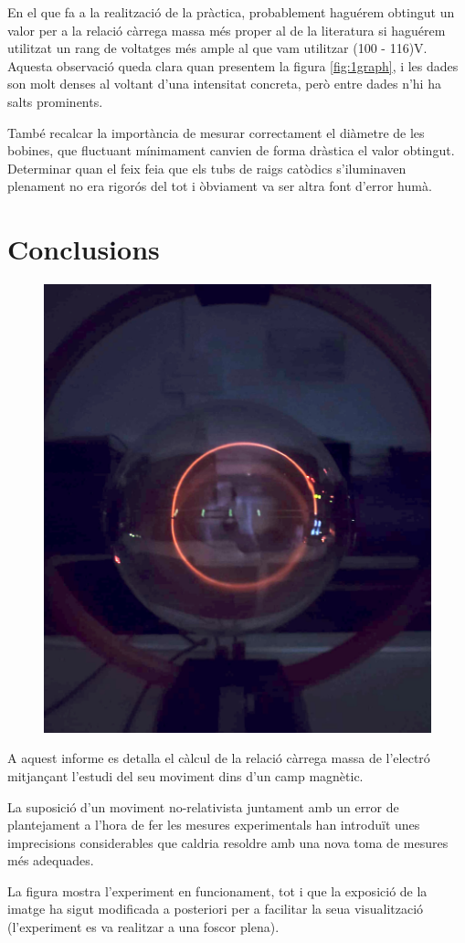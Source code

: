 \documentclass[11pt]{article}
\begin{document}
    \vspace{0.4cm}En el que fa a la realització de la pràctica, probablement haguérem obtingut un valor per a la relació càrrega massa més proper al de la literatura si haguérem utilitzat un rang de voltatges més ample al que vam utilitzar (100 - 116)V. Aquesta observació queda clara quan presentem la figura \ref{fig:1graph}, i les dades son molt denses al voltant d'una intensitat concreta, però entre dades n'hi ha salts prominents.

    \vspace{0.4cm}També recalcar la importància de mesurar correctament el diàmetre de les bobines, que fluctuant mínimament canvien de forma dràstica el valor obtingut. Determinar quan el feix feia que els tubs de raigs catòdics s'iluminaven plenament no era rigorós del tot i òbviament va ser altra font d'error humà. 
\section{Conclusions}
    \begin{figure}
        \vspace{-0.89cm}
        \begin{center}
            \includegraphics[width=.253\textwidth]{fotos/feix.jpeg}
        \end{center}
    \end{figure}
    A aquest informe es detalla el càlcul de la relació càrrega massa de l'electró mitjançant l'estudi del seu moviment dins d'un camp magnètic. 
    
    \vspace{0.35cm}La suposició d'un moviment no-relativista juntament amb un error de plantejament a l'hora de fer les mesures experimentals han introduït unes imprecisions considerables que caldria resoldre amb una nova toma de mesures més adequades.

    \vspace{0.35cm}La figura mostra l'experiment en funcionament, tot i que la exposició de la imatge ha sigut modificada a posteriori per a facilitar la seua visualització (l'experiment es va realitzar a una foscor plena).
\end{document}
